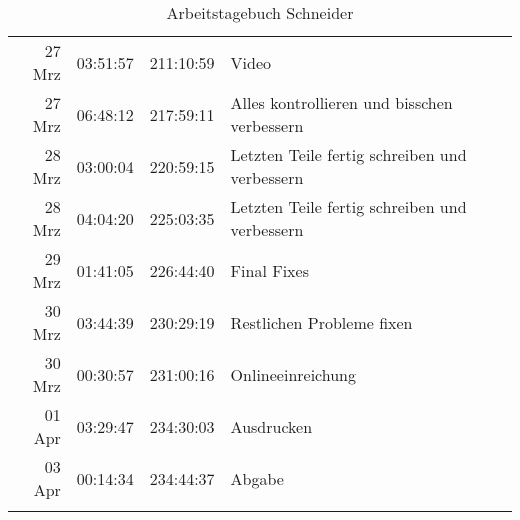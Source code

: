 \begin{longtable}{r | r | r | p{}}
	 27 Mrz & 03:51:57 & 211:10:59 & Video \\ 
	 27 Mrz & 06:48:12 & 217:59:11 & Alles kontrollieren und bisschen verbessern \\ 
	 28 Mrz & 03:00:04 & 220:59:15 & Letzten Teile fertig schreiben und verbessern \\ 
	 28 Mrz & 04:04:20 & 225:03:35 & Letzten Teile fertig schreiben und verbessern \\ 
	 29 Mrz & 01:41:05 & 226:44:40 & Final Fixes \\ 
	 30 Mrz & 03:44:39 & 230:29:19 & Restlichen Probleme fixen \\ 
	 30 Mrz & 00:30:57 & 231:00:16 & Onlineeinreichung \\ 
	 01 Apr & 03:29:47 & 234:30:03 & Ausdrucken \\ 
	 03 Apr & 00:14:34 & 234:44:37 & Abgabe \\ 

    \caption{Arbeitstagebuch Schneider}
    \label{tab:projectdiaryschneider}
\end{longtable}

\newpage
